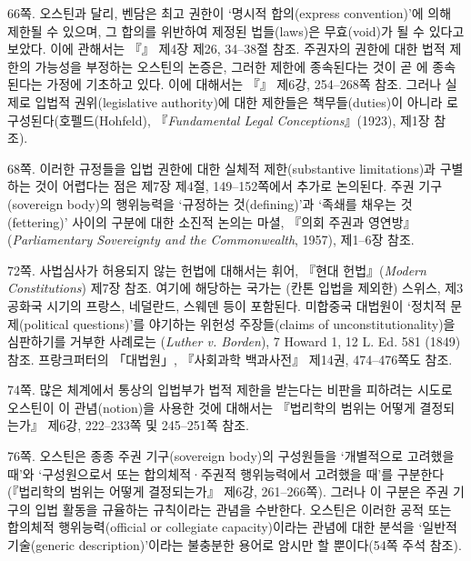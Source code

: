 {\noteentry 66쪽.  오스틴과 달리, 벤담은 최고
권한이 ‘명시적 합의(express convention)’에 의해 제한될 수 있으며, 그
합의를 위반하여 제정된 법들(laws)은 무효(void)가 될 수 있다고 보았다.
이에 관해서는 『』
제4장 제26, 34--38절 참조. 주권자의 권한에 대한 법적 제한의 가능성을
부정하는 오스틴의 논증은, 그러한 제한에 종속된다는 것이 곧
에 종속된다는 가정에 기초하고 있다. 이에 대해서는
『』 제6강,
254--268쪽 참조. 그러나 실제로 입법적 권위(legislative authority)에 대한
제한들은 책무들(duties)이 아니라 로
구성된다(호펠드(Hohfeld), 『\emph{Fundamental Legal
Conceptions}』(1923), 제1장 참조).

\noteentry 68쪽.  이러한 규정들을 입법
권한에 대한 실체적 제한(substantive limitations)과 구별하는 것이
어렵다는 점은 제7장 제4절, 149--152쪽에서 추가로 논의된다. 주권
기구(sovereign body)의 행위능력을 ‘규정하는 것(defining)’과 ‘족쇄를
채우는 것(fettering)’ 사이의 구분에 대한 소진적 논의는 마셜, 『의회
주권과 영연방』(\emph{Parliamentary Sovereignty and the Commonwealth},
1957), 제1--6장 참조.

\noteentry 72쪽.  사법심사가 허용되지 않는 헌법에
대해서는 휘어, 『현대 헌법』(\emph{Modern Constitutions}) 제7장 참조.
여기에 해당하는 국가는 (칸톤 입법을 제외한) 스위스, 제3공화국 시기의
프랑스, 네덜란드, 스웨덴 등이 포함된다. 미합중국 대법원이 ‘정치적
문제(political questions)’를 야기하는 위헌성 주장들(claims of
unconstitutionality)을 심판하기를 거부한 사례로는 (\emph{Luther v. Borden}), 7 Howard 1, 12 L. Ed. 581 (1849) 참조.
프랑크퍼터의 「대법원」, 『사회과학 백과사전』 제14권, 474--476쪽도
참조.

\noteentry 74쪽.  많은 체계에서 통상의 입법부가 법적 제한을 받는다는 비판을
피하려는 시도로 오스틴이 이 관념(notion)을 사용한 것에 대해서는
『법리학의 범위는 어떻게 결정되는가』 제6강, 222--233쪽 및 245--251쪽
참조.

\noteentry 76쪽.  오스틴은 종종 주권 기구(sovereign body)의 구성원들을 ‘개별적으로
고려했을 때’와 ‘구성원으로서 또는 합의체적·주권적 행위능력에서 고려했을
때’를 구분한다(『법리학의 범위는 어떻게 결정되는가』 제6강, 261--266쪽).
그러나 이 구분은 주권 기구의 입법 활동을 규율하는 규칙이라는 관념을
수반한다. 오스틴은 이러한 공적 또는 합의체적 행위능력(official or
collegiate capacity)이라는 관념에 대한 분석을 ‘일반적 기술(generic
description)’이라는 불충분한 용어로 암시만 할 뿐이다(54쪽 주석 참조).

}
